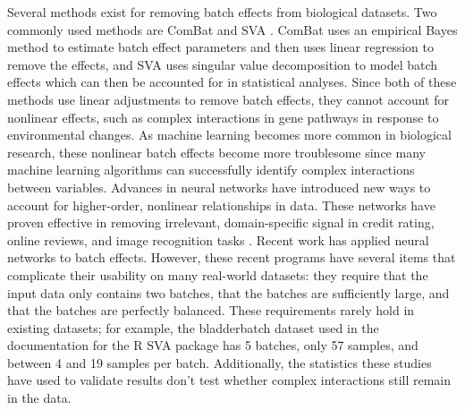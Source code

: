 \documentclass[notitlepage]{article}
\begin{document}
Several methods exist for removing batch effects from biological datasets.
Two commonly used methods are ComBat \citep{johnson_adjusting_2007} and SVA \citep{leek_capturing_2007}.
ComBat uses an empirical Bayes method to estimate batch effect parameters and then uses linear regression to remove the effects, and SVA uses singular value decomposition to model batch effects which can then be accounted for in statistical analyses.
Since both of these methods use linear adjustments to remove batch effects, they cannot account for nonlinear effects, such as complex interactions in gene pathways in response to environmental changes.
As machine learning becomes more common in biological research, these nonlinear batch effects become more troublesome since many machine learning algorithms can successfully identify complex interactions between variables.
Advances in neural networks have introduced new ways to account for higher-order, nonlinear relationships in data.
These networks have proven effective in removing irrelevant, domain-specific signal in credit rating, online reviews, and image recognition tasks \citep{louizos_variational_2015}.
Recent work \cite{shaham_removal_2017,shaham_batch_2018,upadhyay_removal_2019} has applied neural networks to batch effects.
However, these recent programs have several items that complicate their usability on many real-world datasets:
they require that the input data only contains two batches, that the batches are sufficiently large, and that the batches are perfectly balanced.
These requirements rarely hold in existing datasets; for example, the bladderbatch dataset used in the documentation for the R SVA package \cite{leek_bladderbatch_2017,leek_sva_2017} has 5 batches, only 57 samples, and between 4 and 19 samples per batch.
Additionally, the statistics these studies have used to validate results don't test whether complex interactions still remain in the data.
\end{document}
